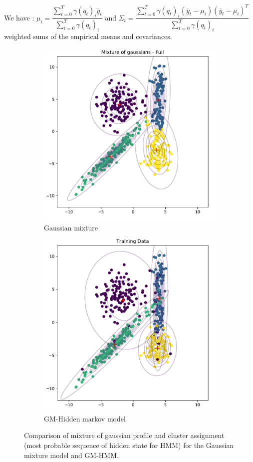 \documentclass[11pt, oneside]{amsart}   	%
\begin{document}
 We have : $\boxed{\mu_i = \dfrac{\sum_{t=0}^T \gamma(q_t)_i \overline{y}_t}{\sum_{t=0}^T \gamma(q_t)_i}}$ and $\boxed{\Sigma_i = \dfrac{\sum_{t=0}^{T}  \gamma(q_t)_i  (\overline{y}_t - \mu_i)(\overline{y}_t - \mu_i)^T}{\sum_{t=0}^T \gamma(q_t)_i}}$ weighted sums of the empirical means and covariances.
 \begin{figure}[!h]
 \centering
 \begin{subfigure}{.4\textwidth}
 \centering
  \includegraphics[width=.8\linewidth]{full.pdf}
  \caption{Gaussian mixture}
 \end{subfigure}
   \begin{subfigure}{.4\textwidth}
    \centering
 \includegraphics[width=.8\linewidth]{training_gmhmm.pdf}
 \caption{GM-Hidden markov model}
 \end{subfigure}
 \caption{Comparison of mixture of gaussian profile and cluster assignment (most probable sequence of hidden state for HMM) for the Gaussian mixture model and GM-HMM.}
 \end{figure}
 
\end{document}
